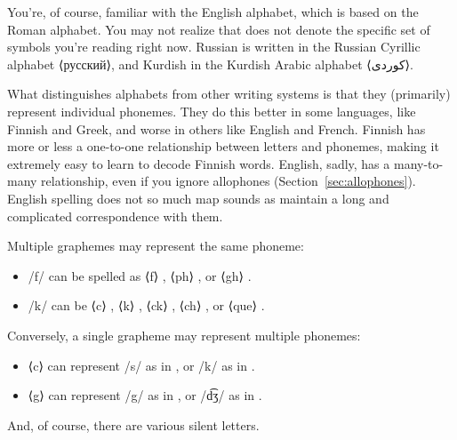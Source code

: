 You're, of course, familiar with the English alphabet, which is based on the Roman alphabet. You may not realize that  does not denote the specific set of symbols you're reading right now. Russian is written in the Russian Cyrillic alphabet ⟨русский⟩, and Kurdish in the Kurdish Arabic alphabet ⟨{\persian کوردی}⟩.

What distinguishes alphabets from other writing systems is that they (primarily) represent individual phonemes. They do this better in some languages, like Finnish and Greek, and worse in others like English and French. Finnish has more or less a one-to-one relationship between letters and phonemes, making it extremely easy to learn to decode Finnish words. English, sadly, has a many-to-many relationship, even if you ignore allophones (Section~\ref{sec:allophones}). English spelling does not so much map sounds as maintain a long and complicated correspondence with them. 

Multiple graphemes may represent the same phoneme:

\begin{itemize}[noitemsep]
    \item /f/ can be spelled as ⟨f⟩ , ⟨ph⟩ , or ⟨gh⟩ .
    \item /k/ can be ⟨c⟩ , ⟨k⟩ , ⟨ck⟩ , ⟨ch⟩ , or ⟨que⟩ .
\end{itemize}
        
Conversely, a single grapheme may represent multiple phonemes:
\begin{itemize}[noitemsep]
    \item ⟨c⟩ can represent /s/ as in , or /k/ as in .
    \item ⟨g⟩ can represent /g/ as in , or /d͡ʒ/ as in .
\end{itemize}
        
And, of course, there are various silent letters.

